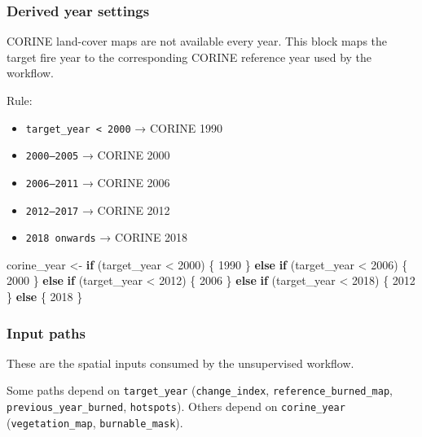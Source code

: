 \documentclass[
  british,
  a4paper,
]{scrbook}
\newenvironment{Shaded}{\begin{snugshade}}{\end{snugshade}}
\newcommand{\ControlFlowTok}[1]{\textcolor[rgb]{0.00,0.23,0.31}{\textbf{#1}}}
\newcommand{\DecValTok}[1]{\textcolor[rgb]{0.68,0.00,0.00}{#1}}
\newcommand{\NormalTok}[1]{\textcolor[rgb]{0.00,0.23,0.31}{#1}}
\newcommand{\OtherTok}[1]{\textcolor[rgb]{0.00,0.23,0.31}{#1}}
\newcommand{\SpecialCharTok}[1]{\textcolor[rgb]{0.37,0.37,0.37}{#1}}
\providecommand{\tightlist}{%
  \setlength{\itemsep}{0pt}\setlength{\parskip}{0pt}}
\begin{document}
\subsubsection{Derived year settings}\label{derived-year-settings}

CORINE land-cover maps are not available every year. This block maps the
target fire year to the corresponding CORINE reference year used by the
workflow.

Rule:

\begin{itemize}
\tightlist
\item
  \texttt{target\_year\ \textless{}\ 2000} → CORINE 1990
\item
  \texttt{2000–2005} → CORINE 2000
\item
  \texttt{2006–2011} → CORINE 2006
\item
  \texttt{2012–2017} → CORINE 2012
\item
  \texttt{2018\ onwards} → CORINE 2018
\end{itemize}

\begin{Shaded}
\begin{Highlighting}[]
\NormalTok{corine\_year }\OtherTok{\textless{}{-}} \ControlFlowTok{if}\NormalTok{ (target\_year }\SpecialCharTok{\textless{}} \DecValTok{2000}\NormalTok{) \{}
  \DecValTok{1990}
\NormalTok{\} }\ControlFlowTok{else} \ControlFlowTok{if}\NormalTok{ (target\_year }\SpecialCharTok{\textless{}} \DecValTok{2006}\NormalTok{) \{}
  \DecValTok{2000}
\NormalTok{\} }\ControlFlowTok{else} \ControlFlowTok{if}\NormalTok{ (target\_year }\SpecialCharTok{\textless{}} \DecValTok{2012}\NormalTok{) \{}
  \DecValTok{2006}
\NormalTok{\} }\ControlFlowTok{else} \ControlFlowTok{if}\NormalTok{ (target\_year }\SpecialCharTok{\textless{}} \DecValTok{2018}\NormalTok{) \{}
  \DecValTok{2012}
\NormalTok{\} }\ControlFlowTok{else}\NormalTok{ \{}
  \DecValTok{2018}
\NormalTok{\}}
\end{Highlighting}
\end{Shaded}

\subsubsection{Input paths}\label{input-paths}

These are the spatial inputs consumed by the unsupervised workflow.

Some paths depend on \texttt{target\_year} (\texttt{change\_index},
\texttt{reference\_burned\_map}, \texttt{previous\_year\_burned},
\texttt{hotspots}). Others depend on \texttt{corine\_year}
(\texttt{vegetation\_map}, \texttt{burnable\_mask}).
\end{document}
